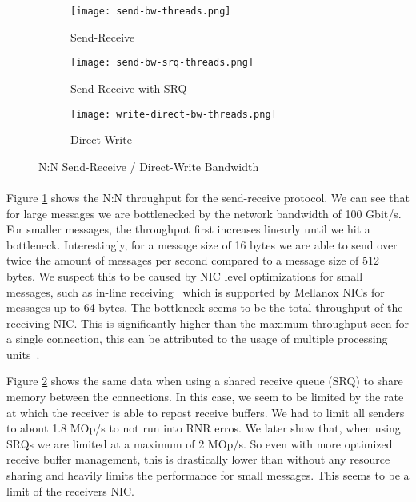 \begin{figure}[ht]
  \centering
\begin{subfigure}[b]{0.49\textwidth}
  \centering
  \texttt{[image: send-bw-threads.png]}
  \caption{Send-Receive}
  \label{fig:plot-sndrcv-bw-thread-nosrq}
\end{subfigure}
\begin{subfigure}[b]{0.49\textwidth}
  \centering
  \texttt{[image: send-bw-srq-threads.png]}
  \caption{Send-Receive with SRQ}
  \label{fig:plot-sndrcv-bw-thread-srq}
\end{subfigure}
  \begin{subfigure}[b]{0.48\textwidth}
  \centering
  \texttt{[image: write-direct-bw-threads.png]}
  \caption{Direct-Write}
  \label{fig:plot-wdir-bw-threads}
  \end{subfigure}
\caption{N:N Send-Receive / Direct-Write Bandwidth}
  \label{fig:plot-sndrcv-bw-thread}
\end{figure}


\paragraph{} Figure \ref{fig:plot-sndrcv-bw-thread-nosrq} shows the N:N throughput for the send-receive protocol.
We can see that for large messages we are bottlenecked by the network bandwidth of 100 Gbit/s. For smaller
messages, the throughput first increases linearly until we hit a bottleneck. Interestingly, for a message size 
of 16 bytes we are able to send over twice the amount of messages per second compared to a message size of 512 bytes.
We suspect this to be caused by NIC level optimizations for small messages, such as in-line receiving~\cite{anuj-guide} which 
is supported by Mellanox NICs for messages up to 64 bytes. The bottleneck seems to be the total throughput of the 
receiving NIC. This is significantly higher than the maximum throughput seen for a single connection, this can be 
attributed to the usage of multiple processing units~\cite{anuj-guide}.


Figure \ref{fig:plot-sndrcv-bw-thread-srq} shows the same data when using a shared receive queue (SRQ) to share memory
between the connections. In this case, we seem to be limited by the rate at which the receiver is able to
repost receive buffers. We
had to limit all senders to about 1.8 MOp/s to not run into RNR erros.
We later show that, when using SRQs we are limited at a maximum of 2 MOp/s. So even with more optimized receive buffer management,
this is drastically lower than without any resource sharing and heavily limits the performance for small messages. This seems
to be a limit of the receivers NIC.

